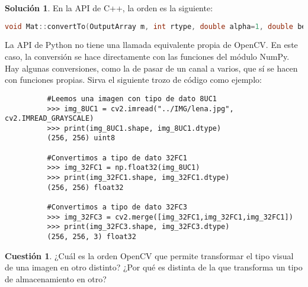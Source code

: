 \documentclass[a4paper, 11pt]{article}
\theoremstyle{definition}
\newtheorem{cuestion}{Cuestión}
\newtheorem*{solucion}{Solución}
\begin{document}
  \begin{solucion}
      En la API de C++, la orden es la siguiente:
      \begin{lstlisting}[language=C++]
          void Mat::convertTo(OutputArray m, int rtype, double alpha=1, double beta=0) const
      \end{lstlisting}

      La API de Python no tiene una llamada equivalente propia de OpenCV. En este caso, la conversión se hace directamente con las funciones del módulo NumPy. Hay algunas conversiones, como la de pasar de un canal a varios, que sí se hacen con funciones propias. Sirva el siguiente trozo de código como ejemplo:

      \begin{lstlisting}
          #Leemos una imagen con tipo de dato 8UC1
          >>> img_8UC1 = cv2.imread("../IMG/lena.jpg", cv2.IMREAD_GRAYSCALE)
          >>> print(img_8UC1.shape, img_8UC1.dtype)
          (256, 256) uint8

          #Convertimos a tipo de dato 32FC1
          >>> img_32FC1 = np.float32(img_8UC1)
          >>> print(img_32FC1.shape, img_32FC1.dtype)
          (256, 256) float32

          #Convertimos a tipo de dato 32FC3
          >>> img_32FC3 = cv2.merge([img_32FC1,img_32FC1,img_32FC1])
          >>> print(img_32FC3.shape, img_32FC3.dtype)
          (256, 256, 3) float32
      \end{lstlisting}
  \end{solucion}

  \begin{cuestion}
      ¿Cuál es la orden OpenCV que permite transformar el tipo visual de una imagen en otro distinto? ¿Por qué es distinta de la que transforma un tipo de almacenamiento en otro?
  \end{cuestion}
\end{document}
